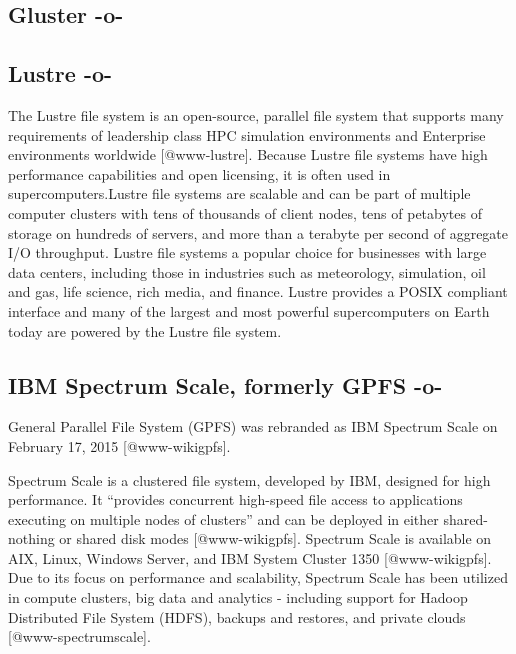 \subsection{Gluster -o-}



\subsection{Lustre -o-}

The Lustre file system is an open-source, parallel file system that
supports many requirements of leadership class HPC simulation
environments and Enterprise environments
worldwide [@www-lustre]. Because Lustre file systems have high
performance capabilities and open licensing, it is often used in
supercomputers.Lustre file systems are scalable and can be part of
multiple computer clusters with tens of thousands of client nodes,
tens of petabytes of storage on hundreds of servers, and more than a
terabyte per second of aggregate I/O throughput. Lustre file systems a
popular choice for businesses with large data centers, including those
in industries such as meteorology, simulation, oil and gas, life
science, rich media, and finance. Lustre provides a POSIX compliant
interface and many of the largest and most powerful supercomputers on
Earth today are powered by the Lustre file system.


     
\subsection{IBM Spectrum Scale, formerly GPFS -o-}

General Parallel File System (GPFS) was rebranded as IBM Spectrum
Scale on February 17, 2015 [@www-wikigpfs].

Spectrum Scale is a clustered file system, developed by IBM, designed
for high performance. It ``provides concurrent high-speed file access
to applications executing on multiple nodes of clusters'' and can be
deployed in either shared-nothing or shared disk
modes [@www-wikigpfs].  Spectrum Scale is available on AIX, Linux,
Windows Server, and IBM System Cluster 1350 [@www-wikigpfs].  Due
to its focus on performance and scalability, Spectrum Scale has been
utilized in compute clusters, big data and analytics - including
support for Hadoop Distributed File System (HDFS), backups and
restores, and private clouds [@www-spectrumscale].



